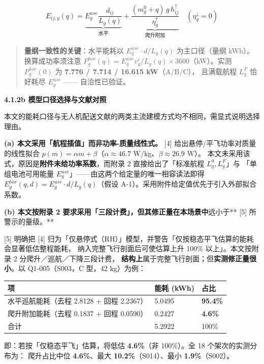 \documentclass[
  10.5pt,
]{article}
\newcounter{none} %
\begin{document}
\[E_{ij,g}(q)=\underbrace{E^{use}_g\frac{d_{ij}}{L_g(q)}}_{\text{水平}}+\underbrace{\frac{(m^0_g+q)\,g\,h^\uparrow_{ij}}{\eta^\uparrow_g}}_{\text{爬升附加}}\quad(\eta^\downarrow_g=0)\]

\begin{quote}
\textbf{量纲一致性的关键}：水平能耗以 \(E^{use}_g\cdot d/L_g(q)\)
为主口径（量纲 kWh）。换算成功率须注意
\(P^{hor}_g(q)=E^{use}_g v^c_g/L_g(q)\times 3600\)（kW）。实测
\(P^{hor}_g(0)\) 为 \textbf{7.776 / 7.714 / 16.615 kW}（A/B/C），
且满载航程 \(L^F_g\) 恰好耗尽 \(E^{use}_g\) ------ 自洽性已验证。
\end{quote}

\textbf{4.1.2b 模型口径选择与文献对照}

本文的能耗口径与无人机配送文献的两类主流建模方式均不相同，需显式说明选择理由。

\textbf{(a) 本文采用「航程插值」而非功率-质量线性式。} {[}4{]}
给出悬停/平飞功率对质量的线性拟合
\(p(m)=\alpha m+\beta\)（\(\alpha\approx46.7\)
W/kg、\(\beta\approx26.9\) W）。
本文未采用该式，原因是\textbf{附件未给功率系数}，而附录 2
直接给出了「标准航程 \(L^0_g,L^F_g\)」与 「单组电池可用能量
\(E^{use}_g\)」------由这两个给定量的唯一相容读法即得
\(E^{hor}_g(q,d)=E^{use}_g\cdot d/L_g(q)\)（假设
A-1）。采用附件给定值优先于引入外部拟合系数。

\textbf{(b) 本文按附录 2
要求采用「三段计费」，但其修正量在本场景中}远小于** {[}5{]}
所警示的量级。**

{[}5{]} 明确把 {[}4{]}
归为「仅悬停式（RH）」模型，并警告「仅按稳态平飞估算的能耗会显著低估整程能耗，
纳入完整飞行剖面后可使估算上升 100\% 以上」。本文按附录 2
分爬升／巡航／下降三段计费，
\textbf{结构上}属于完整飞行剖面；但\textbf{实测修正量很小}。以
Q1-005（S003，C 型，42 kg）为例：

{\def\LTcaptype{none} %
\begin{longtable}[]{@{}lll@{}}
\toprule\noalign{}
项 & 能耗 (kWh) & 占比 \\
\midrule\noalign{}
\endhead
\bottomrule\noalign{}
\endlastfoot
水平巡航能耗（去程 2.8128 + 回程 2.2367） & 5.0495 & \textbf{95.4\%} \\
爬升附加能耗（去程 0.1837 + 回程 0.0590） & 0.2427 & \textbf{4.6\%} \\
合计 & 5.2922 & 100\% \\
\end{longtable}
}

即：若按「仅稳态平飞」估算，将低估 \textbf{4.6\%}（非 100\%）。全 18
个架次的实测分布为： 爬升占比中位 \textbf{4.6\%}、最大
\textbf{10.2\%}（S014）、最小 \textbf{1.9\%}（S002）。
\end{document}
